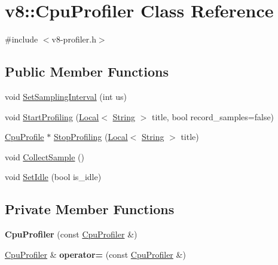 \hypertarget{classv8_1_1_cpu_profiler}{}\section{v8\+:\+:Cpu\+Profiler Class Reference}
\label{classv8_1_1_cpu_profiler}


{\ttfamily \#include $<$v8-\/profiler.\+h$>$}

\subsection*{Public Member Functions}
\begin{DoxyCompactItemize}
\item 
void \hyperlink{classv8_1_1_cpu_profiler_ac5b05c72fb899e20adfa7f8cc57f21fb}{Set\+Sampling\+Interval} (int us)
\item 
void \hyperlink{classv8_1_1_cpu_profiler_a7a9b75d3d7285d90344e1b8f14e97076}{Start\+Profiling} (\hyperlink{classv8_1_1_local}{Local}$<$ \hyperlink{classv8_1_1_string}{String} $>$ title, bool record\+\_\+samples=false)
\item 
\hyperlink{classv8_1_1_cpu_profile}{Cpu\+Profile} $\ast$ \hyperlink{classv8_1_1_cpu_profiler_aa25e1c2d218e4206311e7dff890c0009}{Stop\+Profiling} (\hyperlink{classv8_1_1_local}{Local}$<$ \hyperlink{classv8_1_1_string}{String} $>$ title)
\item 
void \hyperlink{classv8_1_1_cpu_profiler_ac497150fc1bced99d37d0ac1e932defa}{Collect\+Sample} ()
\item 
void \hyperlink{classv8_1_1_cpu_profiler_a68e6da6f9ff4a0d3bde505f378a9a7fa}{Set\+Idle} (bool is\+\_\+idle)
\end{DoxyCompactItemize}
\subsection*{Private Member Functions}
\begin{DoxyCompactItemize}
\item 
{\bfseries Cpu\+Profiler} (const \hyperlink{classv8_1_1_cpu_profiler}{Cpu\+Profiler} \&)\hypertarget{classv8_1_1_cpu_profiler_acd636cc747bdb4859a2008131114d8db}{}\label{classv8_1_1_cpu_profiler_acd636cc747bdb4859a2008131114d8db}

\item 
\hyperlink{classv8_1_1_cpu_profiler}{Cpu\+Profiler} \& {\bfseries operator=} (const \hyperlink{classv8_1_1_cpu_profiler}{Cpu\+Profiler} \&)\hypertarget{classv8_1_1_cpu_profiler_a829217b88e4f452ed9f890365c715488}{}\label{classv8_1_1_cpu_profiler_a829217b88e4f452ed9f890365c715488}

\end{DoxyCompactItemize}



